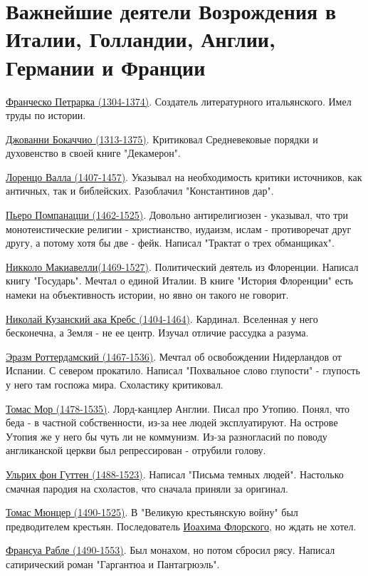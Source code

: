 \documentclass[12pt,a4paper]{article}
\begin{document}
\section{Важнейшие деятели Возрождения в Италии, Голландии, Англии, Германии и Франции}

\underline{Франческо Петрарка (1304-1374)}. 
Создатель литературного итальянского. Имел труды по истории.

\underline{Джованни Бокаччио (1313-1375)}. 
Критиковал Средневековые порядки и духовенство в своей книге "Декамерон". 

\underline{Лоренцо Валла (1407-1457)}. 
Указывал на необходимость критики источников, как античных, так и библейских. Разоблачил "Константинов дар".

\underline{Пьеро Помпанацци (1462-1525)}. Довольно антирелигиозен - указывал, что три монотеистические религии - христианство, иудаизм, ислам - противоречат друг другу, а потому хотя бы две -  фейк. Написал "Трактат о трех обманщиках".

\underline{Никколо Макиавелли(1469-1527)}. Политический деятель из Флоренции. Написал книгу "Государь". Мечтал о единой Италии. В книге "История Флоренции" есть намеки на объективность истории, но явно он такого не говорит.

\underline{Николай Кузанский ака Кребс (1404-1464)}. Кардинал. Вселенная у него бесконечна, а Земля - не ее центр. Изучал отличие рассудка а разума.

\underline{Эразм Роттердамский (1467-1536)}. Мечтал об освобождении Нидерландов от Испании. С севером прокатило. Написал "Похвальное слово глупости" - глупость у него там госпожа мира. Схоластику критиковал.

\underline{Томас Мор (1478-1535)}. Лорд-канцлер Англии. Писал про Утопию. Понял, что беда - в частной собственности, из-за нее людей эксплуатируют. На острове Утопия же у него бы чуть ли не коммунизм. Из-за разногласий по поводу англиканской церкви был репрессирован - отрубили голову.



\underline{Ульрих фон Гуттен (1488-1523)}. Написал "Письма темных людей". Настолько смачная пародия на схоластов, что сначала приняли за оригинал.

\underline{Томас Мюнцер (1490-1525)}. В "Великую крестьянскую войну" был предводителем крестьян. Последователь \underline{Иоахима Флорского}, но ждать не хотел.

\underline{Франсуа Рабле (1490-1553)}. Был монахом, но потом сбросил рясу. Написал сатирический роман "Гаргантюа и Пантагрюэль".
\end{document}
